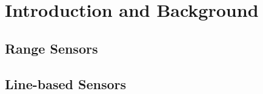 
\chapter{Introduction and Background}
\thispagestyle{myheadings}

\section{Range Sensors}


\section{Line-based Sensors}
